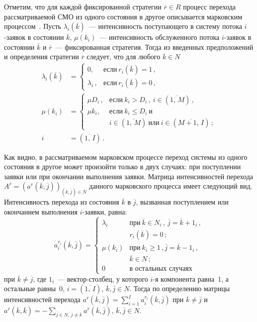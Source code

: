\begin{multicols}{2}
  Отметим, что для каждой фиксированной стратегии $\overline{r}\in R$
процесс перехода рассматриваемой СМО из одного состояния в другое
описывается марковским процессом~\cite{8ag}. Пусть
$\lambda_i(\overline{k})$~--- интенсивность поступающего в систему потока
$i$-заявок в состоянии $\overline{k}$, $\mu(k_i)$~--- интенсивность
обслуженного потока $i$-заявок в состоянии $\overline{k}$ и $\overline{r}$~---
фиксированная стратегия. Тогда из введенных предположений и определения
стратегии $\overline{r}$ следует, что для любого $\overline{k}\in N$
%
  \begin{align*}
  \lambda_i (\overline{k}) &=
  \begin{cases}
  0,\, & \mbox{если}\ r_i(\overline{k})=1\,,\\
  \lambda_i\,, & \mbox{если}\ r_i (\overline{k})=0\,,
  \end{cases}\\
  \mu (k_i) &=
  \begin{cases}
  \mu D_i\,, & \mbox{если}\ k_i>D_i\,,\ i\in (\overline{1,\,M})\,,\\
  \mu k_i,\, & \mbox{если}\ k_i \leq D_i\ \mbox{и}\\
  & i\in (\overline{1,\,M})\ \mbox{или}\ i\in (\overline{M+1,\,I})\,;
  \end{cases}\\
  i & = (\overline{1,\,I})\,.
  \end{align*}

  Как видно, в рассматриваемом марковском процессе переход системы из
одного состояния в другое может произойти только в двух случаях: при
поступлении заявки или при окончании выполнения заявки. Матрица
интенсивностей перехода $A^{\overline{r}} = (a^{\overline{r}}
(\overline{k},\overline{j}))_{(\overline{k},\overline{j})\in N}$ данного
марковского процесса имеет следующий вид. Интенсивность перехода из
состояния $\overline{k}$ в $\overline{j}$, вызванная поступлением или
окончанием выполнения $i$-заявки, равна:
%
  \begin{equation}
a_i^{r_i}(\overline{k},\overline{j}) =
  \begin{cases}
  \lambda_i & \mbox{при}\ \overline{k}\in N_i\,,\ \overline{j}=\overline{k}+1_i\,,\\
  & r_i(\overline{k})=0\,;\\
  \mu (k_i) & \mbox{при}\ k_i\geq 1\,, \overline{j} =\overline{k}-1_i\,,\\
  & \overline{k}\in N\,;\\
  0 & \mbox{в\ остальных\ случаях}
  \end{cases}
\label{e2ag}
  \end{equation}
  при $\overline{k} \not=\overline{j}$, где $1_i$~--- вектор-столбец, у которого
$i$-я компонента равна~1, а остальные равны~0, $i=(\overline{1,\,I})$,
$\overline{k},\overline{j} \in N$. Тогда по определению матрицы
интенсивностей перехода $a^{\overline{r}}(\overline{k},\overline{j}) =
\sum\limits_{i=1}^I a_i^{r_i} (\overline{k},\overline{j})$ при
$\overline{k}\not=\overline{j}$ и $a^{\overline{r}} (\overline{k},\overline{k}) = -
\sum\limits_{\overline{j}\in N,\, \overline{j}\not=\overline{k}}
a^{\overline{r}}(\overline{k},\overline{j})$, $\overline{k},\overline{j}\in N$.


\end{multicols}
